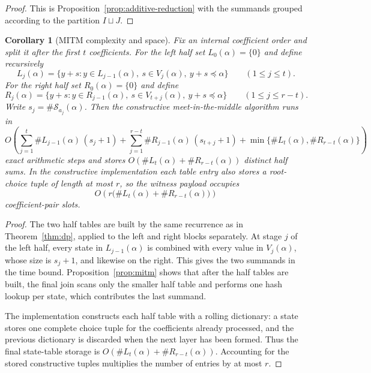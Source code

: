 \documentclass[manuscript]{acmart}
\theoremstyle{plain}
\newtheorem{corollary}[theorem]{Corollary}
\theoremstyle{definition}
\theoremstyle{nonitalicremark}
\newcommand{\cS}{\mathcal{S}}
\begin{document}
\begin{proof}
This is Proposition~\ref{prop:additive-reduction} with the summands grouped according to the
partition $I\sqcup J$.
\end{proof}


\begin{corollary}[MITM complexity and space]\label{cor:mitm-complexity}
Fix an internal coefficient order and split it after the first $t$ coefficients. For the left half
set $L_0(\alpha)=\{0\}$ and define recursively
\[
L_j(\alpha)=\{y+s : y\in L_{j-1}(\alpha),\ s\in V_j(\alpha),\ y+s\preccurlyeq \alpha\}
\qquad (1\le j\le t).
\]
For the right half set $R_0(\alpha)=\{0\}$ and define
\[
R_j(\alpha)=\{y+s : y\in R_{j-1}(\alpha),\ s\in V_{t+j}(\alpha),\ y+s\preccurlyeq \alpha\}
\qquad (1\le j\le r-t).
\]
Write $s_j=\#\cS_{a_j}(\alpha)$. Then the constructive meet-in-the-middle algorithm runs in
\[
O\!\left(
\sum_{j=1}^{t}\#L_{j-1}(\alpha)\,(s_j+1)
+
\sum_{j=1}^{r-t}\#R_{j-1}(\alpha)\,(s_{t+j}+1)
+
\min\{\#L_t(\alpha),\#R_{r-t}(\alpha)\}
\right)
\]
exact arithmetic steps and stores $O(\#L_t(\alpha)+\#R_{r-t}(\alpha))$ distinct half sums. In the constructive
implementation each table entry also stores a root-choice tuple of length at most $r$, so the
witness payload occupies
\[
O\!\left(r\bigl(\#L_t(\alpha)+\#R_{r-t}(\alpha)\bigr)\right)
\]
coefficient-pair slots.
\end{corollary}

\begin{proof}
The two half tables are built by the same recurrence as in Theorem~\ref{thm:dp}, applied to the left
and right blocks separately. At stage $j$ of the left half, every state in $L_{j-1}(\alpha)$ is
combined with every value in $V_j(\alpha)$, whose size is $s_j+1$, and likewise on the right. This
gives the two summands in the time bound. Proposition~\ref{prop:mitm} shows that after the half
tables are built, the final join scans only the smaller half table and performs one hash lookup per
state, which contributes the last summand.

The implementation constructs each half table with a rolling dictionary: a state stores one complete
choice tuple for the coefficients already processed, and the previous dictionary is discarded when
the next layer has been formed. Thus the final state-table storage is
$O(\#L_t(\alpha)+\#R_{r-t}(\alpha))$. Accounting for the stored constructive tuples multiplies the
number of entries by at most $r$.
\end{proof}
\end{document}

